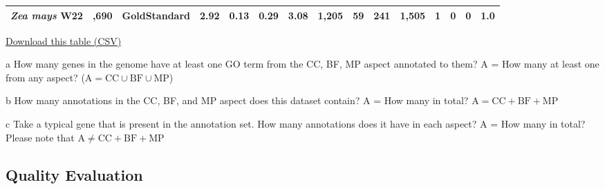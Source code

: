\documentclass[utf8]{frontiersSCNS}
\begin{document}
\begin{table}[t]
{\begin{threeparttable}
\begin{tabular}{lrlrrr>{\bfseries}r|rrr>{\bfseries}r|rrr>{\bfseries}r}
\multirow{-2}{*}{\raggedright\arraybackslash \textit{Zea mays} W22} & \multirow{-2}{*}{\raggedleft\arraybackslash 40,690} & GoldStandard & 2.92 & 0.13 & 0.29 & 3.08 & 1,205 & 59 & 241 & 1,505 & 1 & 0 & 0 & 1.0\\
\bottomrule
\end{tabular}
\begin{tablenotes}
\item \href{https://raw.githubusercontent.com/Dill-PICL/GOMAP-Paper-2019.1/master/analyses/quantity/results/quantity_table.csv}{Download this table (CSV)}
\item[a] How many genes in the genome have at least one GO term from the CC, BF, MP aspect annotated to them? A = How many at least one from any aspect? ($\textrm{A} = \textrm{CC} \cup \textrm{BF} \cup \textrm{MP}$)
\item[b] How many annotations in the CC, BF, and MP aspect does this dataset contain? A = How many in total? $\textrm{A} = \textrm{CC} + \textrm{BF} + \textrm{MP}$
\item[c] Take a typical gene that is present in the annotation set. How many annotations does it have in each aspect? A = How many in total? Please note that $\textrm{A} \neq \textrm{CC} + \textrm{BF} +\textrm{MP}$
\end{tablenotes}
\end{threeparttable}}
\end{table}

\hypertarget{quality-evaluation-1}{%
\subsection{Quality Evaluation}\label{quality-evaluation-1}}
\end{document}
